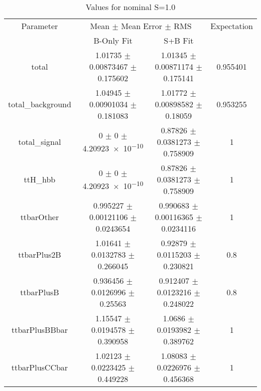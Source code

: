 \begin{table}
\centering
\caption{Values for nominal S=1.0}
\begin{tabular}{cccc}
\toprule
Parameter & \multicolumn{2}{c}{Mean $\pm$ Mean Error $\pm$ RMS} & Expectation\\
 & B-Only Fit & S+B Fit & \\
\midrule
total & \num{1.01735} $\pm$ \num{0.00873467} $\pm$ \num{0.175602} & \num{1.01345} $\pm$ \num{0.00871174} $\pm$ \num{0.175141} & \num{0.955401}\\
total\_background & \num{1.04945} $\pm$ \num{0.00901034} $\pm$ \num{0.181083} & \num{1.01772} $\pm$ \num{0.00898582} $\pm$ \num{0.18059} & \num{0.953255}\\
total\_signal & \num{0} $\pm$ \num{0} $\pm$ \num{4.20923e-10} & \num{0.87826} $\pm$ \num{0.0381273} $\pm$ \num{0.758909} & \num{1}\\
ttH\_hbb & \num{0} $\pm$ \num{0} $\pm$ \num{4.20923e-10} & \num{0.87826} $\pm$ \num{0.0381273} $\pm$ \num{0.758909} & \num{1}\\
ttbarOther & \num{0.995227} $\pm$ \num{0.00121106} $\pm$ \num{0.0243654} & \num{0.990683} $\pm$ \num{0.00116365} $\pm$ \num{0.0234116} & \num{1}\\
ttbarPlus2B & \num{1.01641} $\pm$ \num{0.0132783} $\pm$ \num{0.266045} & \num{0.92879} $\pm$ \num{0.0115203} $\pm$ \num{0.230821} & \num{0.8}\\
ttbarPlusB & \num{0.936456} $\pm$ \num{0.0126996} $\pm$ \num{0.25563} & \num{0.912407} $\pm$ \num{0.0123216} $\pm$ \num{0.248022} & \num{0.8}\\
ttbarPlusBBbar & \num{1.15547} $\pm$ \num{0.0194578} $\pm$ \num{0.390958} & \num{1.0686} $\pm$ \num{0.0193982} $\pm$ \num{0.389762} & \num{1}\\
ttbarPlusCCbar & \num{1.02123} $\pm$ \num{0.0223425} $\pm$ \num{0.449228} & \num{1.08083} $\pm$ \num{0.0226976} $\pm$ \num{0.456368} & \num{1}\\
\bottomrule
\end{tabular}
\end{table}